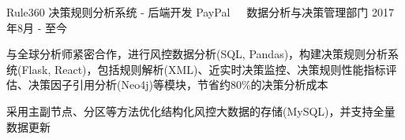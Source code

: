 \documentclass[11pt, a4paper, UTF8]{awesome-cv}
\begin{document}
%
\begin{cventries}
  \cventry
    {Rule360 决策规则分析系统 - 后端开发} %
    {PayPal{\ \cdotp\ \ }数据分析与决策管理部门} %
    {2017年8月 - 至今} %
    {\ } %
    {
      \begin{cvitems} %
        \item {与全球分析师紧密合作，进行风控数据分析(SQL, Pandas)，构建决策规则分析系统(Flask, React)，包括规则解析(XML)、近实时决策监控、决策规则性能指标评估、决策因子引用分析(Neo4j)等模块，节省约80\%的决策分析成本}
        \item {采用主副节点、分区等方法优化结构化风控大数据的存储(MySQL)，并支持全量数据更新}
      \end{cvitems}
    }
    

\end{cventries}
\end{document}
